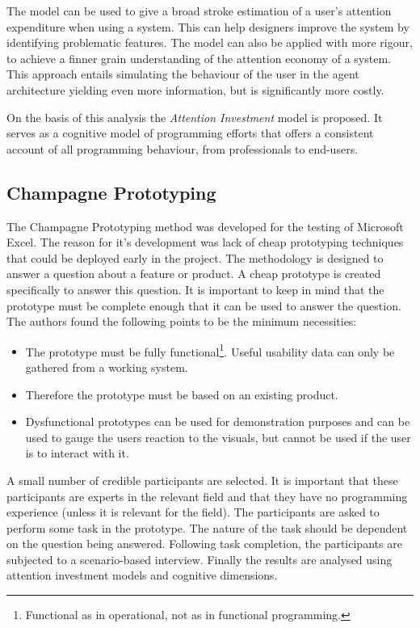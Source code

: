 The model can be used to give a broad stroke estimation of a user's attention expenditure when using a system. This can help designers improve the system by identifying problematic features. The model can also be applied with more rigour, to achieve a finner grain understanding of the attention economy of a system. This approach entails simulating the behaviour of the user in the agent architecture yielding even more information, but is significantly more costly.

On the basis of this analysis the \textit{Attention Investment} model is proposed. It serves as a cognitive model of programming efforts that offers a consistent account of all programming behaviour, from professionals to end-users.

\subsection{Champagne Prototyping} \label{sec:champagne}
The Champagne Prototyping method was developed for the testing of Microsoft Excel\cite{blackwell2004champagne}. The reason for it's development was lack of cheap prototyping techniques that could be deployed early in the project. The methodology is designed to answer a question about a feature or product. A cheap prototype is created specifically to answer this question. It is important to keep in mind that the prototype must be complete enough that it can be used to answer the question. The authors found the following points to be the minimum necessities:
\begin{itemize}
    \item The prototype must be fully functional\footnote{Functional as in operational, not as in functional programming.}. Useful usability data can only be gathered from a working system.
    \item Therefore the prototype must be based on an existing product.
    \item Dysfunctional prototypes can be used for demonstration purposes and can be used to gauge the users reaction to the visuals, but cannot be used if the user is to interact with it.
\end{itemize}
A small number of credible participants are selected. It is important that these participants are experts in the relevant field and that they have no programming experience (unless it is relevant for the field). The participants are asked to perform some task in the prototype. The nature of the task should be dependent on the question being answered. Following task completion, the participants are subjected to a scenario-based interview. Finally the results are analysed using attention investment models and cognitive dimensions.

